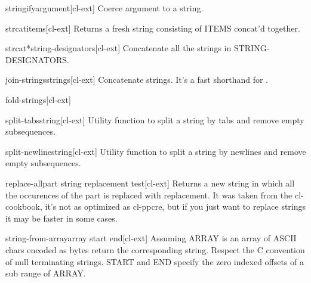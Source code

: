\documentclass[10pt,english]{book}
\begin{document}
\begin{function}{stringify}{argument}[cl-ext]
  Coerce argument to a string.
\end{function}

\begin{function}{strcat}{\rest items}[cl-ext]
  Returns a fresh string consisting of ITEMS concat'd together.
\end{function}

\begin{function}{strcat*}{string-designators}[cl-ext]
  Concatenate all the strings in STRING-DESIGNATORS.
\end{function}

\begin{function}{join-strings}{strings}[cl-ext]
  Concatenate strings. It's a fast shorthand for .
\end{function}

\begin{function}{fold-strings}{}[cl-ext]
  
\end{function}

\begin{function}{split-tabs}{string}[cl-ext]
  Utility function to split a string by tabs and remove empty
  subsequences.
\end{function}

\begin{function}{split-newline}{string}[cl-ext]
  Utility function to split a string by newlines and remove empty
  subsequences.
\end{function}

\begin{function}{replace-all}{part string replacement \key test}[cl-ext]
  Returns a new string in which all the occurences of the part is
  replaced with replacement. It was taken from the cl-cookbook, it's
  not as optimized as cl-ppcre, but if you just want to replace
  strings it may be faster in some cases.
\end{function}

\begin{function}{string-from-array}{array \key start end}[cl-ext]
  Assuming ARRAY is an array of ASCII chars encoded as bytes return
the corresponding string. Respect the C convention of null terminating
strings. START and END specify the zero indexed offsets of a sub range
of ARRAY.
\end{function}
\end{document}
